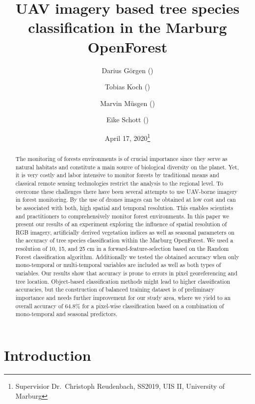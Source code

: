 \documentclass[]{article}
\title{UAV imagery based tree species classification in the Marburg OpenForest}
\author{Darius Görgen () \and Tobias Koch () \and Marvin Müsgen () \and Eike Schott ()}
\date{April 17, 2020\footnote{Supervisior Dr.~Christoph Reudenbach, SS2019,
  UIS II, University of Marburg}}
\begin{document}
\maketitle
\begin{abstract}
The monitoring of forests environments is of crucial importance since
they serve as natural habitats and constitute a main source of
biological diversity on the planet. Yet, it is very costly and labor
intensive to monitor forests by traditional means and classical remote
sensing technologies restrict the analysis to the regional level. To
overcome these challenges there have been several attempts to use
UAV-borne imagery in forest monitoring. By the use of drones images can
be obtained at low cost and can be associated with both, high spatial
and temporal resolution. This enables scientists and practitioners to
comprehensively monitor forest environments. In this paper we present
our results of an experiment exploring the influence of spatial
resolution of RGB imagery, artificially derived vegetation indices as
well as seasonal parameters on the accuracy of tree species
classification within the Marburg OpenForest. We used a resolution of
10, 15, and 25 cm in a forward-feature-selection based on the Random
Forest classification algorithm. Additionally we tested the obtained
accuracy when only mono-temporal or multi-temporal variables are
included as well as both types of variables. Our results show that
accuracy is prone to errors in pixel georeferencing and tree location.
Object-based classification methods might lead to higher classification
accuracies, but the construction of balanced training dataset is of
preliminary importance and needs further improvement for our study area,
where we yield to an overall accuracy of 64.8\% for a pixel-wise
classification based on a combination of mono-temporal and seasonal
predictors.
\end{abstract}

{
\setcounter{tocdepth}{2}
\tableofcontents
}
\newpage

\hypertarget{introduction}{%
\section{Introduction}\label{introduction}}
\end{document}
